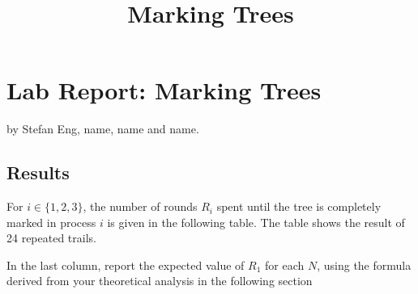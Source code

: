 \documentclass{tufte-handout}
\title{\sf Marking Trees}
\date{}
\begin{document}
\maketitle

\section{Lab Report: Marking Trees}


by Stefan Eng, {name}, {name} and {name}.

\subsection{Results}

For $i\in\{1,2,3\}$, the number of rounds $R_i$ spent until the tree
is completely marked in process $i$ is given in the following table.
The table shows the result of 24 repeated
trails.

In the last column, report the expected value of $R_1$ for each $N$, using the
formula derived from your theoretical analysis in the following section
\end{document}
